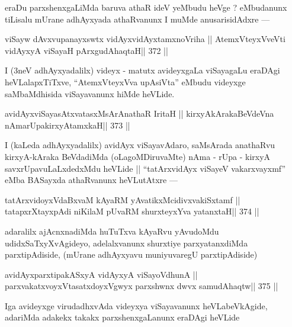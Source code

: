 \begin{artha}
eraDu parxshenxgaLiMda baruva athaR ideV yeMbudu heVge ? eMbudanunx tiLisalu mUrane adhAyxyada athaRvanunx I muMde anusarisidAdxre ---
\end{artha}

\begin{shl}
viSayw dAvxvupanayxswtx vidAyxvidAyxtamxnoVriha ||
AtemxVteyxVveVti vidAyxyA viSayaH pArxgudAhaqtaH\hfill || 372 ||
\end{shl}

\begin{artha}
I (3neV adhAyxyadalilx) videyx - matutx avideyxgaLa viSayagaLu eraDAgi heVLalapxTiTxve, ``AtemxVteyxVva upAsiVta'' eMbudu videyxge saMbaMdhisida viSayavanunx hiMde heVLide.
\end{artha}

\begin{shl}
avidAyxviSayasAtxvatasxMsArAnathaR IritaH ||
kirxyAkArakaBeVdeVna nAmarUpakirxyAtamxkaH\hfill || 373 ||
\end{shl}

\begin{artha}
I (kaLeda adhAyxyadalilx) avidAyx viSayavAdaro, saMsArada anathaRvu kirxyA-kAraka BeVdadiMda (oLagoMDiruvaMte) nAma - rUpa - kirxyA savxrUpavuLaLxdedxMdu heVLide || ``tatArx\s vidAyx viSayeV vakarxvayxmf'' eMba BASayxda athaRvanunx heVLutAtxre ---
\end{artha}

\begin{shl}
tatArxvidoyxVdaBxvaM kAyaRM yAvatikxMcidivxvakiSxtamf ||
tatapxrXtayxpAdi niKilaM pUvaRM shurxteyxYva yatanxtaH\hfill || 374 ||
\end{shl}

\begin{artha}
adaralilx ajAcnxnadiMda huTuTxva kAyaRvu yAvudoMdu udidxSaTxyXvAgideyo, adelalxvanunx shurxtiye parxyatanxdiMda parxtipAdiside, (mUrane adhAyxyavu muniyuvaregU parxtipAdiside)
\end{artha}

\begin{shl}
avidAyxparxtipakASxyA vidAyxyA viSayoV\s dhunA ||
parxvakatxvoyxV\s tasatxdoyxVgwyx parxshwnx dwvx samudAhaqtw\hfill || 375 ||
\end{shl}

\begin{artha}
Iga avideyxge virudadhxvAda videyxya viSayavanunx heVLabeVkAgide, adariMda adakekx takakx parxshenxgaLanunx eraDAgi heVLide
\end{artha}

